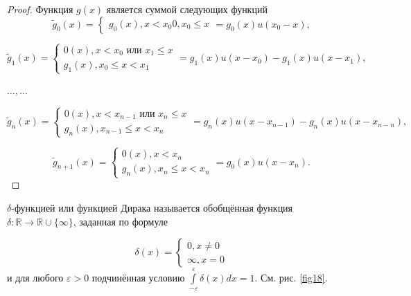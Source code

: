 \begin{proof}
	Функция $g(x)$ является суммой следующих функций
	\begin{equation*}
		\widetilde{g}_0(x)=
		\begin{cases}
			g_0(x), x<x_0
			0,x_0\leqslant x
		\end{cases}
		=g_0(x)u(x_0-x),
	\end{equation*}

	\begin{equation*}
		\widetilde{g}_1(x)=
		\begin{cases}
			0(x), x<x_0 \text{ или } x_1\leqslant x \\
			g_1(x),x_0\leqslant x<x_1
		\end{cases}
		=g_1(x)u(x-x_0)-g_1(x)u(x-x_1),
	\end{equation*}

	$\ldots,\ldots$

	\begin{equation*}
		\widetilde{g}_n(x)=
		\begin{cases}
			0(x), x<x_{n-1} \text{ или } x_n\leqslant x \\
			g_n(x),x_{n-1}\leqslant x<x_n
		\end{cases}
		=g_n(x)u(x-x_{n-1})-g_n(x)u(x-x_{n-n}),
	\end{equation*}

		\begin{equation*}
		\widetilde{g}_{n+1}(x)=
		\begin{cases}
			0(x), x<x_{n}\\
			g_n(x),x_{n}\leqslant x<x_n
		\end{cases}
		=g_0(x)u(x-x_{n}).
	\end{equation*}

\end{proof}

\begin{definition}
\label{def:13.4}
	$\delta$-функцией или функцией Дирака называется обобщённая функция
	$\delta : \mathbb{R}\rightarrow\mathbb{R}\cup\{\infty\}$, заданная по формуле

	\begin{equation*}
		\delta(x)=
		\begin{cases}
			0, x \neq 0 \\
			\infty, x=0			
		\end{cases}
	\end{equation*}
	и для любого $\varepsilon > 0$ подчинённая условию $\int\limits^\varepsilon_{-\varepsilon}\delta(x)dx=1$. См. рис. \ref{fig18}.
\end{definition}

